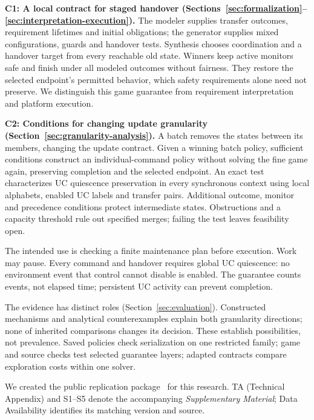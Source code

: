 \documentclass[acmsmall,screen,review,anonymous]{acmart}
\begin{document}
\par\noindent\textbf{C1: A local contract for staged handover (Sections~\ref{sec:formalization}--\ref{sec:interpretation-execution}).} The modeler supplies transfer outcomes, requirement lifetimes and initial obligations; the generator supplies mixed configurations, guards and handover tests. Synthesis chooses coordination and a handover target from every reachable old state. Winners keep active monitors safe and finish under all modeled outcomes without fairness. They restore the selected endpoint's permitted behavior, which safety requirements alone need not preserve. We distinguish this game guarantee from requirement interpretation and platform execution.
\par\noindent\textbf{C2: Conditions for changing update granularity (Section~\ref{sec:granularity-analysis}).} A batch removes the states between its members, changing the update contract. Given a winning batch policy, sufficient conditions construct an individual-command policy without solving the fine game again, preserving completion and the selected endpoint. An exact test characterizes UC quiescence preservation in every synchronous context using local alphabets, enabled UC labels and transfer pairs. Additional outcome, monitor and precedence conditions protect intermediate states. Obstructions and a capacity threshold rule out specified merges; failing the test leaves feasibility open.

The intended use is checking a finite maintenance plan before execution. Work may pause. Every command and handover requires global UC quiescence: no environment event that control cannot disable is enabled. The guarantee counts events, not elapsed time; persistent UC activity can prevent completion.

The evidence has distinct roles (Section~\ref{sec:evaluation}). Constructed mechanisms and analytical counterexamples explain both granularity directions; none of \VThreeEOneTrials{} inherited comparisons changes its decision. These establish possibilities, not prevalence. Saved policies check serialization on one restricted family; game and source checks test selected guarantee layers; \ApplicationContracts{} adapted contracts compare exploration costs within one solver.

We created the public replication package~\cite{FGDUCSAnonymousArtifact} for this research. TA (Technical Appendix) and S1--S5 denote the accompanying \emph{Supplementary Material}; Data Availability identifies its matching version and source.
\end{document}
